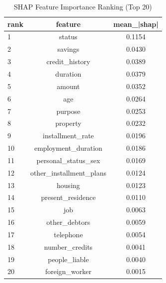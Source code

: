 \begin{table}
\centering
\caption{SHAP Feature Importance Ranking (Top 20)}
\label{tab:shap_ranking}
\begin{tabular}{lcc}
\toprule
rank & feature & mean_|shap| \\
\midrule
1 & status & 0.1154 \\
2 & savings & 0.0430 \\
3 & credit_history & 0.0389 \\
4 & duration & 0.0379 \\
5 & amount & 0.0352 \\
6 & age & 0.0264 \\
7 & purpose & 0.0253 \\
8 & property & 0.0232 \\
9 & installment_rate & 0.0196 \\
10 & employment_duration & 0.0186 \\
11 & personal_status_sex & 0.0169 \\
12 & other_installment_plans & 0.0124 \\
13 & housing & 0.0123 \\
14 & present_residence & 0.0110 \\
15 & job & 0.0063 \\
16 & other_debtors & 0.0059 \\
17 & telephone & 0.0054 \\
18 & number_credits & 0.0041 \\
19 & people_liable & 0.0040 \\
20 & foreign_worker & 0.0015 \\
\bottomrule
\end{tabular}
\end{table}
